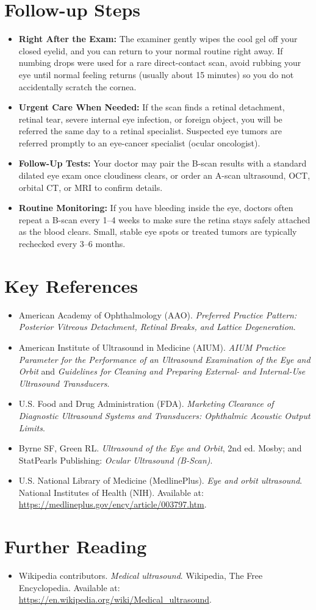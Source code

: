 \section{Follow-up Steps}
\begin{itemize}
    \item \textbf{Right After the Exam:} The examiner gently wipes the cool gel off your closed eyelid, and you can return to your normal routine right away. If numbing drops were used for a rare direct-contact scan, avoid rubbing your eye until normal feeling returns (usually about 15 minutes) so you do not accidentally scratch the cornea.
    \item \textbf{Urgent Care When Needed:} If the scan finds a retinal detachment, retinal tear, severe internal eye infection, or foreign object, you will be referred the same day to a retinal specialist. Suspected eye tumors are referred promptly to an eye-cancer specialist (ocular oncologist).
    \item \textbf{Follow-Up Tests:} Your doctor may pair the B-scan results with a standard dilated eye exam once cloudiness clears, or order an A-scan ultrasound, OCT, orbital CT, or MRI to confirm details.
    \item \textbf{Routine Monitoring:} If you have bleeding inside the eye, doctors often repeat a B-scan every 1--4 weeks to make sure the retina stays safely attached as the blood clears. Small, stable eye spots or treated tumors are typically rechecked every 3--6 months.
\end{itemize}

\section{Key References}
\begin{itemize}
    \item American Academy of Ophthalmology (AAO). \textit{Preferred Practice Pattern: Posterior Vitreous Detachment, Retinal Breaks, and Lattice Degeneration}.
    \item American Institute of Ultrasound in Medicine (AIUM). \textit{AIUM Practice Parameter for the Performance of an Ultrasound Examination of the Eye and Orbit} and \textit{Guidelines for Cleaning and Preparing External- and Internal-Use Ultrasound Transducers}.
    \item U.S. Food and Drug Administration (FDA). \textit{Marketing Clearance of Diagnostic Ultrasound Systems and Transducers: Ophthalmic Acoustic Output Limits}.
    \item Byrne SF, Green RL. \textit{Ultrasound of the Eye and Orbit}, 2nd ed. Mosby; and StatPearls Publishing: \textit{Ocular Ultrasound (B-Scan)}.
    \item U.S. National Library of Medicine (MedlinePlus). \textit{Eye and orbit ultrasound}. National Institutes of Health (NIH). Available at: \url{https://medlineplus.gov/ency/article/003797.htm}.
\end{itemize}

\section{Further Reading}
\begin{itemize}
  \item Wikipedia contributors. \textit{Medical ultrasound}. Wikipedia, The Free Encyclopedia. Available at: \url{https://en.wikipedia.org/wiki/Medical_ultrasound}.
\end{itemize}
